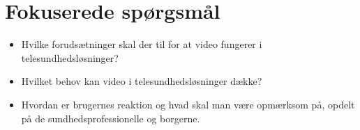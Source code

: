 \section{Fokuserede spørgsmål}
\begin{itemize}
	\item Hvilke forudsætninger skal der til for at video fungerer i telesundhedsløsninger? 
	\item Hvilket behov kan video i telesundhedsløsninger dække?
	\item Hvordan er brugernes reaktion og hvad skal man være opmærksom på, opdelt på de sundhedsprofessionelle og borgerne. 
\end{itemize}

